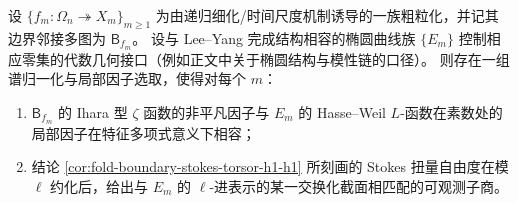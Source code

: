 
\begin{conjecture}\label{conj:fold-boundary-stokes-langlands-modularity}
设 \(\{f_m:\Omega_n\twoheadrightarrow X_m\}_{m\ge 1}\) 为由递归细化/时间尺度机制诱导的一族粗粒化，并记其边界邻接多图为 \(\mathsf B_{f_m}\)。
设与 Lee--Yang 完成结构相容的椭圆曲线族 \(\{E_m\}\) 控制相应零集的代数几何接口（例如正文中关于椭圆结构与模性链的口径）。
则存在一组谱归一化与局部因子选取，使得对每个 \(m\)：
\begin{enumerate}
  \item \(\mathsf B_{f_m}\) 的 Ihara 型 \(\zeta\) 函数的非平凡因子与 \(E_m\) 的 Hasse--Weil \(L\)-函数在素数处的局部因子在特征多项式意义下相容；
  \item 结论 \ref{cor:fold-boundary-stokes-torsor-h1-h1} 所刻画的 Stokes 扭量自由度在模 \(\ell\) 约化后，给出与 \(E_m\) 的 \(\ell\)-进表示的某一交换化截面相匹配的可观测子商。
\end{enumerate}
\end{conjecture}

\endinput

